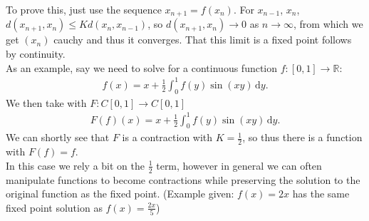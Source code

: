 \documentclass{tikzposter} %
\begin{document}
\begin{columns}
{{    To prove this, just use the sequence $x_{n+1} = f(x_{n})$. For $x_{n-1}$, $x_{n}$, $d(x_{n+1},x_{n}) \le Kd(x_{n},x_{n-1})$, so $d(x_{n+1},x_{n}) \to 0$ as $n \to \infty$, from which we get $(x_{n})$ cauchy and thus it converges. That this limit is a fixed point follows by continuity. \\

    As an example, say we need to solve for a continuous function $f : [0,1] \to \mathbb{R}$:
    \begin{align*}
      f(x) = x + \frac{1}{2}\int_{0}^{1} f(y) \sin(xy) \,\mathrm{d}y.
    \end{align*}
    We then take with $F : C[0,1] \to C[0,1]$
    \begin{align*}
      F(f)(x) = x + \frac{1}{2} \int_{0}^{1} f(y) \sin(xy) \,\mathrm{d}y.
    \end{align*}
    We can shortly see that $F$ is a contraction with $K = \frac{1}{2}$, so thus there is a function with $F(f) = f$. \\

    In this case we rely a bit on the $\frac{1}{2}$ term, however in general we can often manipulate functions to become contractions while preserving the solution to the original function as the fixed point. (Example given: $f(x) = 2x$ has the same fixed point solution as $f(x) = \frac{2x}{5}$)
  }
}
\end{columns}
\end{document}
